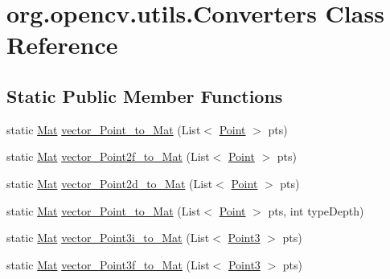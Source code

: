 \hypertarget{classorg_1_1opencv_1_1utils_1_1_converters}{}\section{org.\+opencv.\+utils.\+Converters Class Reference}
\label{classorg_1_1opencv_1_1utils_1_1_converters}
\subsection*{Static Public Member Functions}
\begin{DoxyCompactItemize}
\item 
static \mbox{\hyperlink{classorg_1_1opencv_1_1core_1_1_mat}{Mat}} \mbox{\hyperlink{classorg_1_1opencv_1_1utils_1_1_converters_acccfe768985e43c42d46610e6ffe6909}{vector\+\_\+\+Point\+\_\+to\+\_\+\+Mat}} (List$<$ \mbox{\hyperlink{classorg_1_1opencv_1_1core_1_1_point}{Point}} $>$ pts)
\item 
static \mbox{\hyperlink{classorg_1_1opencv_1_1core_1_1_mat}{Mat}} \mbox{\hyperlink{classorg_1_1opencv_1_1utils_1_1_converters_a4d75a838a49ea6dede97900fc4fd62ff}{vector\+\_\+\+Point2f\+\_\+to\+\_\+\+Mat}} (List$<$ \mbox{\hyperlink{classorg_1_1opencv_1_1core_1_1_point}{Point}} $>$ pts)
\item 
static \mbox{\hyperlink{classorg_1_1opencv_1_1core_1_1_mat}{Mat}} \mbox{\hyperlink{classorg_1_1opencv_1_1utils_1_1_converters_aed84a9227524b66de692d707ef92a85c}{vector\+\_\+\+Point2d\+\_\+to\+\_\+\+Mat}} (List$<$ \mbox{\hyperlink{classorg_1_1opencv_1_1core_1_1_point}{Point}} $>$ pts)
\item 
static \mbox{\hyperlink{classorg_1_1opencv_1_1core_1_1_mat}{Mat}} \mbox{\hyperlink{classorg_1_1opencv_1_1utils_1_1_converters_aaf7c4dd440d16291aa24781a4dddb0f9}{vector\+\_\+\+Point\+\_\+to\+\_\+\+Mat}} (List$<$ \mbox{\hyperlink{classorg_1_1opencv_1_1core_1_1_point}{Point}} $>$ pts, int type\+Depth)
\item 
static \mbox{\hyperlink{classorg_1_1opencv_1_1core_1_1_mat}{Mat}} \mbox{\hyperlink{classorg_1_1opencv_1_1utils_1_1_converters_a23fc3810c568d3d0e6cd504419243507}{vector\+\_\+\+Point3i\+\_\+to\+\_\+\+Mat}} (List$<$ \mbox{\hyperlink{classorg_1_1opencv_1_1core_1_1_point3}{Point3}} $>$ pts)
\item 
static \mbox{\hyperlink{classorg_1_1opencv_1_1core_1_1_mat}{Mat}} \mbox{\hyperlink{classorg_1_1opencv_1_1utils_1_1_converters_ab5b8d876d668a0fc4de50ce1cc1ec8f7}{vector\+\_\+\+Point3f\+\_\+to\+\_\+\+Mat}} (List$<$ \mbox{\hyperlink{classorg_1_1opencv_1_1core_1_1_point3}{Point3}} $>$ pts)

\end{DoxyCompactItemize}
